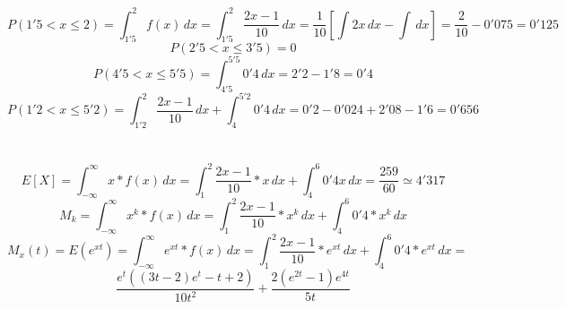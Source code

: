 \problem

\subproblem
\[ P(1'5 < x \leq 2) = \int_{1'5}^{2} f(x) \,dx  = \int_{1'5}^{2} \frac{2x-1}{10} \,dx = \frac{1}{10}[\int 2x \,dx - \int \,dx] = \frac{2}{10} - 0'075 = 0'125\] 
\[P(2'5<x\leq 3'5) = 0\] 
\[P(4'5<x\leq5'5) = \int_{4'5}^{5'5} 0'4 \,dx = 2'2 - 1'8 = 0'4 \]
\[P(1'2 < x \leq 5'2) = \int_{1'2}^2 \frac{2x-1}{10} \,dx + \int_4^{5'2} 0'4 \,dx = 0'2 - 0'024 + 2'08 - 1'6 = 0'656\] \\ \\
\subproblem
\[E[X] = \int_{-\infty}^\infty x*f(x) \,dx = \int_1^2 \frac{2x-1}{10}*x \,dx + \int_4^6 0'4x \,dx = \frac{259}{60} \simeq 4'317 \] 
\[ M_k = \int_{-\infty}^\infty x^k * f(x) \,dx = \int_1^2 \frac{2x-1}{10}* x^k \,dx + \int_4^6 0'4*x^k \,dx \]
\subproblem
\[M_x(t) = E(e^{xt}) = \int_{-\infty}^{\infty} e^{xt} * f(x) \,dx = \int_1^2 \frac{2x-1}{10}*e^{xt} \,dx + \int_4^6 0'4 * e^{xt} \,dx = \] \[ \frac{e^t((3t-2)e^t-t+2)}{10t^2}+ \frac{2(e^{2t}-1)e^{4t}}{5t}\]
